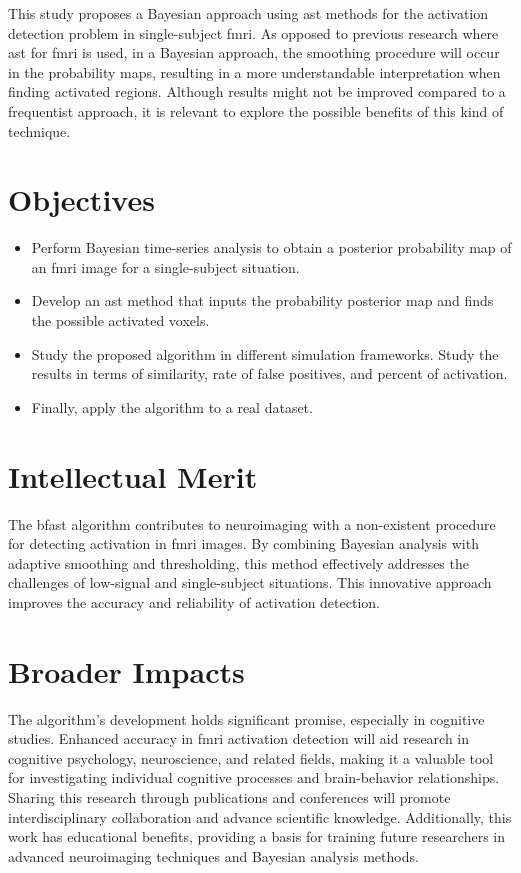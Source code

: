 This study proposes a Bayesian approach using \gls{ast} methods for the 
activation detection problem in single-subject \gls{fmri}. As opposed to 
previous research where \gls{ast} for \gls{fmri} is used, in a Bayesian 
approach, the smoothing procedure will occur in the probability maps, 
resulting in a more understandable interpretation when finding activated 
regions. Although results might not be improved compared to a frequentist 
approach, it is relevant to explore the possible benefits of this kind of 
technique. 

\section{Objectives}

\begin{itemize}
\item Perform Bayesian time-series analysis to obtain a posterior probability 
map of an \gls{fmri} image for a single-subject situation.
\item Develop an \gls{ast} method that inputs the probability posterior map 
and finds the possible activated voxels.
\item Study the proposed algorithm in different simulation frameworks. Study 
the results in terms of similarity, rate of false positives, and percent of 
activation.
\item Finally, apply the algorithm to a real dataset.
\end{itemize}

\section{Intellectual Merit}

The \gls{bfast} algorithm contributes to neuroimaging with a non-existent procedure for 
detecting activation in \gls{fmri} images. By combining Bayesian analysis with 
adaptive smoothing and thresholding, this method effectively addresses the 
challenges of low-signal and single-subject situations. This innovative 
approach improves the accuracy and reliability of activation detection. 

\section{Broader Impacts}

The algorithm's development holds significant promise, especially in 
cognitive studies. Enhanced accuracy in \gls{fmri} activation detection will 
aid research in cognitive psychology, neuroscience, and related fields, 
making it a valuable tool for investigating individual cognitive processes 
and brain-behavior relationships. Sharing this research through publications 
and conferences will promote interdisciplinary collaboration and advance 
scientific knowledge. Additionally, this work has educational benefits, 
providing a basis for training future researchers in advanced neuroimaging 
techniques and Bayesian analysis methods.

